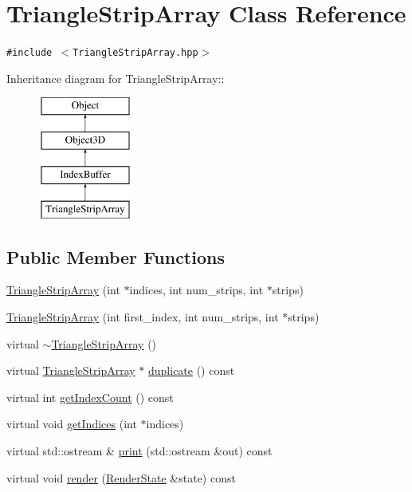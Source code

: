 \hypertarget{classm3g_1_1TriangleStripArray}{
\section{TriangleStripArray Class Reference}
\label{classm3g_1_1TriangleStripArray}
}
{\tt \#include $<$TriangleStripArray.hpp$>$}

Inheritance diagram for TriangleStripArray::\begin{figure}[H]
\begin{center}
\leavevmode
\includegraphics[height=4cm]{classm3g_1_1TriangleStripArray}
\end{center}
\end{figure}
\subsection*{Public Member Functions}
\begin{CompactItemize}
\item 
\hyperlink{classm3g_1_1TriangleStripArray_57d4e874819367084aeadb11593c4436}{TriangleStripArray} (int $\ast$indices, int num\_\-strips, int $\ast$strips)
\item 
\hyperlink{classm3g_1_1TriangleStripArray_d2ca9884a6ccf32da3cee977549b5ee0}{TriangleStripArray} (int first\_\-index, int num\_\-strips, int $\ast$strips)
\item 
virtual \hyperlink{classm3g_1_1TriangleStripArray_1cb3853bf79b7710d57044da818d2cde}{$\sim$TriangleStripArray} ()
\item 
virtual \hyperlink{classm3g_1_1TriangleStripArray}{TriangleStripArray} $\ast$ \hyperlink{classm3g_1_1TriangleStripArray_1623fbdfe91eb2e9d4a67bece6a46904}{duplicate} () const 
\item 
virtual int \hyperlink{classm3g_1_1TriangleStripArray_fe9ae2993ebcdb93d5ff26d57c81b73e}{getIndexCount} () const 
\item 
virtual void \hyperlink{classm3g_1_1TriangleStripArray_650953afac45099025a524ab160b911f}{getIndices} (int $\ast$indices)
\item 
virtual std::ostream \& \hyperlink{classm3g_1_1TriangleStripArray_6fea17fa1532df3794f8cb39cb4f911f}{print} (std::ostream \&out) const 
\item 
virtual void \hyperlink{classm3g_1_1TriangleStripArray_8babc8a79b78615da51161e94029eea9}{render} (\hyperlink{structm3g_1_1RenderState}{RenderState} \&state) const 
\end{CompactItemize}


